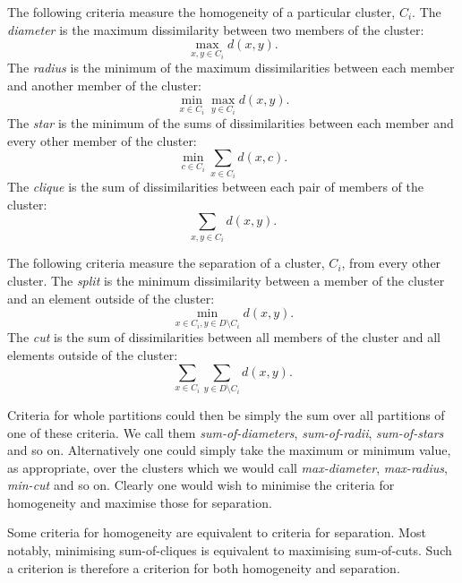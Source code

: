 \documentclass[a4paper]{report}
\newcommand{\dset}{D}
\begin{document}
The following criteria measure the homogeneity of a particular cluster, $C_i$.
The \textit{diameter} is the maximum dissimilarity between two members of the
cluster:
\begin{equation*}
  \max_{x,y \in C_i} d(x,y).
\end{equation*}
The \textit{radius} is the minimum of the maximum dissimilarities between each
member and another member of the cluster:
\begin{equation*}
  \min_{x \in C_i} \max_{y \in C_i} d(x,y).
\end{equation*}
The \textit{star} is the minimum of the sums of dissimilarities between each
member and every other member of the cluster:
\begin{equation*}
  \min_{c \in C_i} \sum_{x \in C_i} d(x,c).
\end{equation*}
The \textit{clique} is the sum of dissimilarities between each pair of members
of the cluster:
\begin{equation*}
  \sum_{x,y \in C_i} d(x,y).
\end{equation*}

The following criteria measure the separation of a cluster, $C_i$, from every
other cluster.  The \textit{split} is the minimum dissimilarity between a
member of the cluster and an element outside of the cluster:
\begin{equation*}
  \min_{x \in C_i, y \in \dset \setminus C_i} d(x,y).
\end{equation*}
The \textit{cut} is the sum of dissimilarities between all members of the
cluster and all elements outside of the cluster:
\begin{equation*}
  \sum_{x \in C_i} \sum_{y \in \dset \setminus C_i} d(x,y).
\end{equation*}

Criteria for whole partitions could then be simply the sum over all partitions
of one of these criteria.  We call them \textit{sum-of-diameters},
\textit{sum-of-radii}, \textit{sum-of-stars} and so on.  Alternatively one
could simply take the maximum or minimum value, as appropriate, over the
clusters which we would call \textit{max-diameter}, \textit{max-radius},
\textit{min-cut} and so on.  Clearly one would wish to minimise the criteria
for homogeneity and maximise those for separation.

Some criteria for homogeneity are equivalent to criteria for separation.  Most
notably, minimising sum-of-cliques is equivalent to maximising sum-of-cuts.
Such a criterion is therefore a criterion for both homogeneity and separation.
\end{document}
